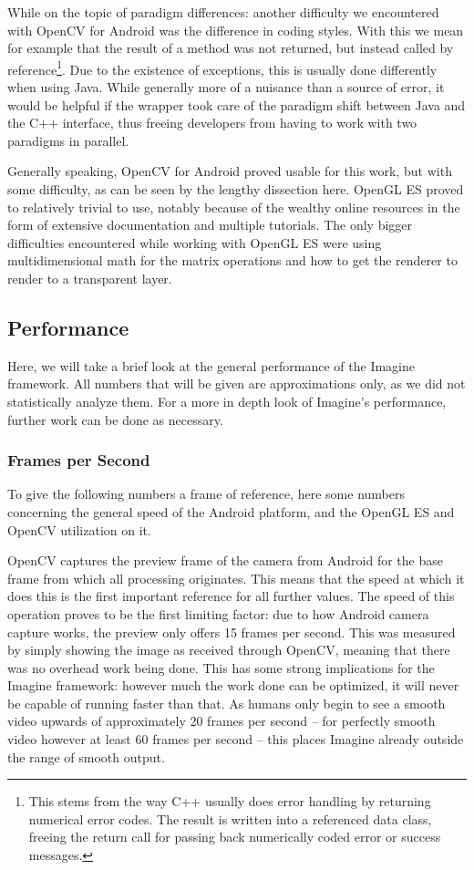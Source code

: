 While on the topic of paradigm differences: another difficulty we encountered with OpenCV for Android was the difference in coding styles.
With this we mean for example that the result of a method was not returned, but instead called by reference\footnote{This stems from the way C++ usually does error handling by returning numerical error codes. The result is written into a referenced data class, freeing the return call for passing back numerically coded error or success messages.}.
Due to the existence of exceptions, this is usually done differently when using Java.
While generally more of a nuisance than a source of error, it would be helpful if the wrapper took care of the paradigm shift between Java and the C++ interface, thus freeing developers from having to work with two paradigms in parallel.

Generally speaking, OpenCV for Android proved usable for this work, but with some difficulty, as can be seen by the lengthy dissection here.
OpenGL ES proved to relatively trivial to use, notably because of the wealthy online resources in the form of extensive documentation and multiple tutorials.
The only bigger difficulties encountered while working with OpenGL ES were using multidimensional math for the matrix operations and how to get the renderer to render to a transparent layer.

\subsection{Performance}
\label{performance}

Here, we will take a brief look at the general performance of the Imagine framework.
All numbers that will be given are approximations only, as we did not statistically analyze them.
For a more in depth look of Imagine's performance, further work can be done as necessary.

\subsubsection{Frames per Second}

To give the following numbers a frame of reference, here some numbers concerning the general speed of the Android platform, and the OpenGL ES and OpenCV utilization on it.

OpenCV captures the preview frame of the camera from Android for the base frame from which all processing originates.
This means that the speed at which it does this is the first important reference for all further values.
The speed of this operation proves to be the first limiting factor: due to how Android camera capture works, the preview only offers 15 frames per second.
This was measured by simply showing the image as received through OpenCV, meaning that there was no overhead work being done.
This has some strong implications for the Imagine framework: however much the work done can be optimized, it will never be capable of running faster than that.
As humans only begin to see a smooth video upwards of approximately 20 frames per second – for perfectly smooth video however at least 60 frames per second – this places Imagine already outside the range of smooth output.

